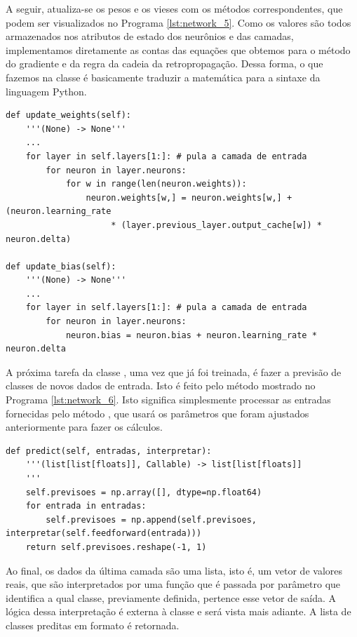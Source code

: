 A seguir, atualiza-se os pesos e os vieses com os métodos correspondentes, que podem ser visualizados no Programa \ref{lst:network_5}. Como os valores são todos armazenados nos atributos de estado dos neurônios e das camadas, implementamos diretamente as contas das equações que obtemos para o método do gradiente e da regra da cadeia da retropropagação. Dessa forma, o que fazemos na classe  é basicamente traduzir a matemática para a sintaxe da linguagem Python.
\newline
\estiloR
\begin{lstlisting}[caption={Trecho da classe \eng{Network}}, label={lst:network_5}, escapeinside={\%}]
def update_weights(self):
    '''(None) -> None'''
    ...
    for layer in self.layers[1:]: # pula a camada de entrada
        for neuron in layer.neurons:
            for w in range(len(neuron.weights)):
                neuron.weights[w,] = neuron.weights[w,] + (neuron.learning_rate
                     * (layer.previous_layer.output_cache[w]) * neuron.delta)

def update_bias(self):
    '''(None) -> None'''
    ...
    for layer in self.layers[1:]: # pula a camada de entrada
        for neuron in layer.neurons:
            neuron.bias = neuron.bias + neuron.learning_rate * neuron.delta
\end{lstlisting}


A próxima tarefa da classe , uma vez que já foi treinada, é fazer a previsão de classes de novos dados de entrada. Isto é feito pelo método mostrado no Programa \ref{lst:network_6}. Isto significa simplesmente processar as entradas fornecidas pelo método , que usará os parâmetros que foram ajustados anteriormente para fazer os cálculos. 
\newline
\estiloR
\begin{lstlisting}[caption={Trecho da classe \eng{Network}}, label={lst:network_6}, escapeinside={\%}]
def predict(self, entradas, interpretar):
    '''(list[list[floats]], Callable) -> list[list[floats]]
    '''
    self.previsoes = np.array([], dtype=np.float64)
    for entrada in entradas:
        self.previsoes = np.append(self.previsoes, interpretar(self.feedforward(entrada)))
    return self.previsoes.reshape(-1, 1)
\end{lstlisting}


Ao final, os dados da última camada são uma lista, isto é, um vetor de valores reais, que são interpretados por uma função que é passada por parâmetro que identifica a qual classe, previamente definida, pertence esse vetor de saída. A lógica dessa interpretação é externa à classe  e será vista mais adiante. A lista de classes preditas em formato  é retornada.

